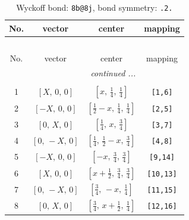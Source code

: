 \documentclass[fleqn,8pt]{jsarticle}
\begin{document}
\renewcommand{\arraystretch}{1.2}
\begin{longtable}{cccc}
\caption{Wyckoff bond: {\tt 8b@8j}, bond symmetry: {\tt .2.}}
 \\
 \hline \hline
No. & vector & center & mapping \\ \hline \endfirsthead

\multicolumn{3}{l}{\tablename\ \thetable{}} \\
 \hline \hline
No. & vector & center & mapping \\ \hline \endhead

 \hline \hline
\multicolumn{3}{r}{\footnotesize\it continued ...} \\ \endfoot

 \hline \hline
\multicolumn{3}{r}{} \\ \endlastfoot

1 & $\left[ X,\, 0,\, 0 \right]$ & $\left[ x,\, \frac{1}{4},\, \frac{1}{4} \right]$ & {\tt [1,6]} \\ \hline
2 & $\left[ - X,\, 0,\, 0 \right]$ & $\left[ \frac{1}{2} - x,\, \frac{1}{4},\, \frac{1}{4} \right]$ & {\tt [2,5]} \\ \hline
3 & $\left[ 0,\, X,\, 0 \right]$ & $\left[ \frac{1}{4},\, x,\, \frac{3}{4} \right]$ & {\tt [3,7]} \\ \hline
4 & $\left[ 0,\, - X,\, 0 \right]$ & $\left[ \frac{1}{4},\, \frac{1}{2} - x,\, \frac{3}{4} \right]$ & {\tt [4,8]} \\ \hline
5 & $\left[ - X,\, 0,\, 0 \right]$ & $\left[ - x,\, \frac{3}{4},\, \frac{3}{4} \right]$ & {\tt [9,14]} \\ \hline
6 & $\left[ X,\, 0,\, 0 \right]$ & $\left[ x + \frac{1}{2},\, \frac{3}{4},\, \frac{3}{4} \right]$ & {\tt [10,13]} \\ \hline
7 & $\left[ 0,\, - X,\, 0 \right]$ & $\left[ \frac{3}{4},\, - x,\, \frac{1}{4} \right]$ & {\tt [11,15]} \\ \hline
8 & $\left[ 0,\, X,\, 0 \right]$ & $\left[ \frac{3}{4},\, x + \frac{1}{2},\, \frac{1}{4} \right]$ & {\tt [12,16]} \\
\end{longtable}
\renewcommand{\arraystretch}{1.2}
\end{document}
